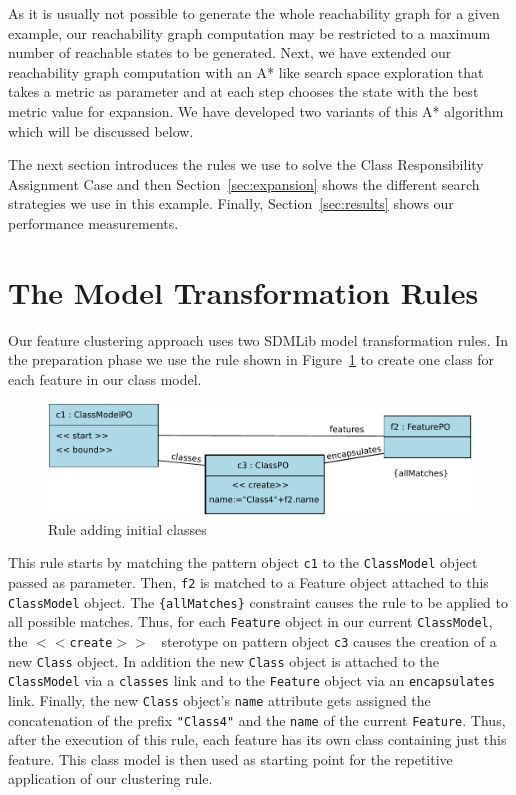 \documentclass[submission,copyright,creativecommons]{eptcs}
\begin{document}
As it is usually not possible to generate the whole reachability graph for a given example, 
our reachability graph computation may be restricted to a maximum number of reachable 
states to be generated. Next, we have extended our reachability graph computation with an A* 
like search space exploration that takes a metric as parameter and at each step chooses the 
state with the best metric value for expansion. We have developed two variants of this A* 
algorithm which will be discussed below. 

The next section introduces the rules we use to solve the Class Responsibility Assignment Case
and then Section~\ref{sec:expansion} shows the different search strategies we use in this 
example. Finally, Section~\ref{sec:results} shows our performance measurements. 
 

\section{The Model Transformation Rules}
\label{sec:rules}

Our feature clustering approach uses two SDMLib model transformation rules. In the 
preparation phase we use the rule shown in Figure~\ref{fig:RuleInitialClasses} to create 
one class for each feature in our class model. 

\begin{figure}[ht] \centering
	\includegraphics[width=\linewidth]{images/RuleAddInitialClasses.pdf}
 \caption{Rule adding initial classes}
 \label{fig:RuleInitialClasses}
\end{figure}

This rule starts by matching the pattern object \texttt{c1} to the 
\texttt{ClassModel} object passed as parameter. Then, \texttt{f2} is matched to a 
Feature object attached to this \texttt{ClassModel} object. The 
\texttt{\{allMatches\}} constraint causes the rule to be applied to all possible 
matches. Thus, for each \texttt{Feature} object in our current 
\texttt{ClassModel}, the \texttt {$<<$create$>>$ } sterotype on pattern object 
\texttt{c3} causes the creation of a new \texttt{Class} object. In addition 
the new \texttt{Class} object is attached to the \texttt{ClassModel} via a 
\texttt{classes} link and to the \texttt{Feature} object via an 
\texttt{encapsulates} link. Finally, the new \texttt{Class} object's \texttt{name} 
attribute gets assigned the concatenation of the prefix \texttt{"Class4"} 
and the \texttt{name} of the current \texttt{Feature}. Thus, after the 
execution of this rule, each feature has its own class containing just this 
feature. This class model is then used as starting point for the repetitive 
application of our clustering rule. 
\end{document}
